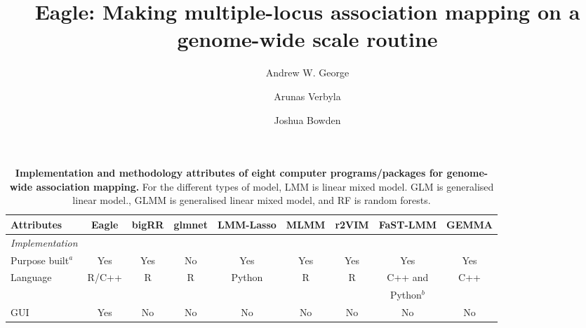 \documentclass{article}
\begin{document}
\title{Eagle: Making multiple-locus association mapping on a genome-wide scale routine}
\author[1]{Andrew W. George}
\author[1]{Arunas Verbyla}
\author[2]{Joshua Bowden}


\maketitle






\begin{landscape}

\begin{table}
\caption{{\bf Implementation and methodology attributes of eight computer programs/packages for genome-wide association mapping.} For the different types of model, 
LMM is linear mixed model.  GLM is generalised linear model., GLMM is generalised linear mixed model, and RF is random forests. 
}
\label{suptabsummary}
\vspace{0.5cm}
\begin{tabular}{lcccccccc} \hline
                                                   Attributes                  & {\bf Eagle}                                 & {\bf bigRR}             & {\bf glmnet}            & {\bf LMM-Lasso}                    & {\bf MLMM} & {\bf r2VIM}      & {\bf FaST-LMM} & {\bf GEMMA} \\  \hline
{\em Implementation}    &         &            &             &                   &            &                &      &      \\ 
\hspace{1mm}  Purpose built$^a$    &   Yes     &    Yes      &  No   &   Yes  &  Yes  &  Yes  & Yes  & Yes          \\ [0.35cm]


\hspace{1mm}  Language                 &  R/C++       &    R        &      R       &     Python     &  R          &    R         &  C++ and     &   C++   \\  
                                                          &         &            &             &                   &            &                                     &   Python$^b$       &      \\  [0.35cm]

\hspace{1mm} GUI                            & Yes &    No      & No          &  No    &  No    &   No     & No     & No    \\  [0.35cm]





\end{tabular}
\end{table}
\end{landscape}
\end{document}
